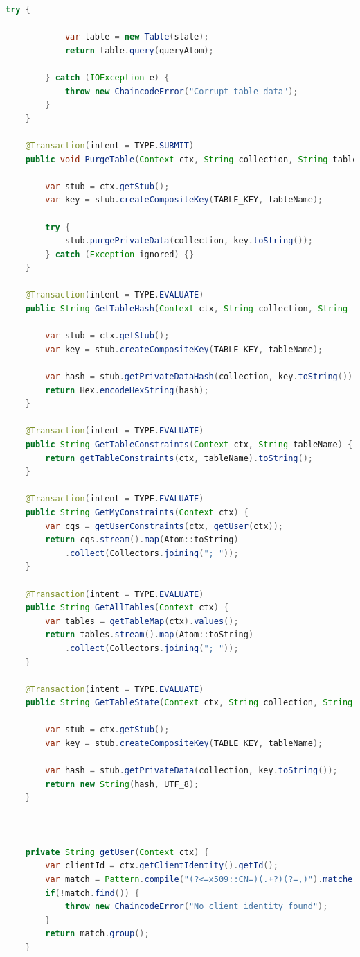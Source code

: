 \documentclass[12pt]{article}
\begin{document}
\begin{lstlisting}[style=java, language=java]
        try {

            var table = new Table(state);
            return table.query(queryAtom);

        } catch (IOException e) {
            throw new ChaincodeError("Corrupt table data");
        }
    }

    @Transaction(intent = TYPE.SUBMIT)
    public void PurgeTable(Context ctx, String collection, String tableName) {

        var stub = ctx.getStub();
        var key = stub.createCompositeKey(TABLE_KEY, tableName);

        try {
            stub.purgePrivateData(collection, key.toString());
        } catch (Exception ignored) {}
    }

    @Transaction(intent = TYPE.EVALUATE)
    public String GetTableHash(Context ctx, String collection, String tableName) {

        var stub = ctx.getStub();
        var key = stub.createCompositeKey(TABLE_KEY, tableName);

        var hash = stub.getPrivateDataHash(collection, key.toString());
        return Hex.encodeHexString(hash);
    }

    @Transaction(intent = TYPE.EVALUATE)
    public String GetTableConstraints(Context ctx, String tableName) {
        return getTableConstraints(ctx, tableName).toString();
    }

    @Transaction(intent = TYPE.EVALUATE)
    public String GetMyConstraints(Context ctx) {
        var cqs = getUserConstraints(ctx, getUser(ctx));
        return cqs.stream().map(Atom::toString)
            .collect(Collectors.joining("; "));
    }

    @Transaction(intent = TYPE.EVALUATE)
    public String GetAllTables(Context ctx) {
        var tables = getTableMap(ctx).values();
        return tables.stream().map(Atom::toString)
            .collect(Collectors.joining("; "));
    }

    @Transaction(intent = TYPE.EVALUATE)
    public String GetTableState(Context ctx, String collection, String tableName) {

        var stub = ctx.getStub();
        var key = stub.createCompositeKey(TABLE_KEY, tableName);

        var hash = stub.getPrivateData(collection, key.toString());
        return new String(hash, UTF_8);
    }



    private String getUser(Context ctx) {
        var clientId = ctx.getClientIdentity().getId();
        var match = Pattern.compile("(?<=x509::CN=)(.+?)(?=,)").matcher(clientId);
        if(!match.find()) {
            throw new ChaincodeError("No client identity found");
        }
        return match.group();
    }


\end{lstlisting}
\end{document}
